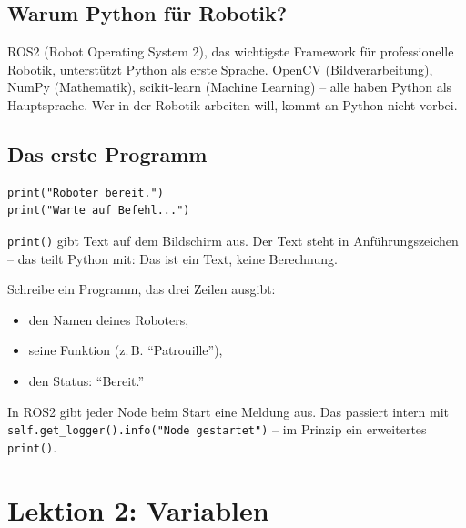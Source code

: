 \subsection*{Warum Python für Robotik?}

\begin{praxis}
ROS2 (Robot Operating System 2), das wichtigste Framework für professionelle Robotik, unterstützt Python als erste Sprache. OpenCV (Bildverarbeitung), NumPy (Mathematik), scikit-learn (Machine Learning) -- alle haben Python als Hauptsprache. Wer in der Robotik arbeiten will, kommt an Python nicht vorbei.
\end{praxis}

\subsection*{Das erste Programm}

\begin{lstlisting}
print("Roboter bereit.")
print("Warte auf Befehl...")
\end{lstlisting}

\begin{merksatz}
\texttt{print()} gibt Text auf dem Bildschirm aus. Der Text steht in Anführungszeichen -- das teilt Python mit: Das ist ein Text, keine Berechnung.
\end{merksatz}

\begin{uebung}[title=Übung 1.1: Erste Ausgaben]
Schreibe ein Programm, das drei Zeilen ausgibt:
\begin{itemize}
    \item den Namen deines Roboters,
    \item seine Funktion (z.\,B. ``Patrouille''),
    \item den Status: ``Bereit.''
\end{itemize}
\end{uebung}

\begin{ros}
In ROS2 gibt jeder Node beim Start eine Meldung aus. Das passiert intern mit \texttt{self.get\_logger().info("Node gestartet")} -- im Prinzip ein erweitertes \texttt{print()}.
\end{ros}

\section{Lektion 2: Variablen}

